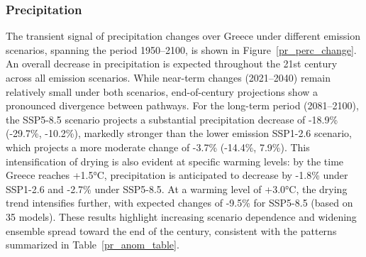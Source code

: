 \documentclass[pdflatex,sn-chicago]{sn-jnl}%
\theoremstyle{thmstyleone}%
\theoremstyle{thmstyletwo}%
\theoremstyle{thmstylethree}%
\begin{document}
\subsubsection{Precipitation}
The transient signal of precipitation changes over Greece under different emission scenarios, spanning the period 1950--2100, is shown in Figure~\ref{pr_perc_change}. An overall decrease in precipitation is expected throughout the 21st century across all emission scenarios. While near-term changes (2021--2040) remain relatively small under both scenarios, end-of-century projections show a pronounced divergence between pathways. For the long-term period (2081--2100), the SSP5-8.5 scenario projects a substantial precipitation decrease of -18.9\% (-29.7\%, -10.2\%), markedly stronger than the lower emission SSP1-2.6 scenario, which projects a more moderate change of -3.7\% (-14.4\%, 7.9\%). This intensification of drying is also evident at specific warming levels: by the time Greece reaches +1.5°C, precipitation is anticipated to decrease by -1.8\% under SSP1-2.6 and -2.7\% under SSP5-8.5. At a warming level of +3.0°C, the drying trend intensifies further, with expected changes of -9.5\% for SSP5-8.5 (based on 35 models). These results highlight increasing scenario dependence and widening ensemble spread toward the end of the century, consistent with the patterns summarized in Table~\ref{pr_anom_table}.
\end{document}
